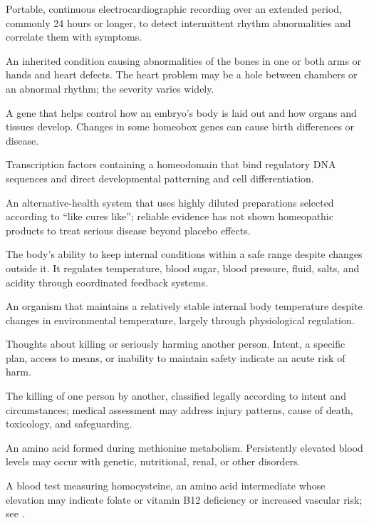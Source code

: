  Portable, continuous electrocardiographic recording over an extended period, commonly 24 hours or longer, to detect intermittent rhythm abnormalities and correlate them with symptoms.

 An inherited condition causing abnormalities of the bones in one or both arms or hands and heart defects. The heart problem may be a hole between chambers or an abnormal rhythm; the severity varies widely.

 A gene that helps control how an embryo’s body is laid out and how organs and tissues develop. Changes in some homeobox genes can cause birth differences or disease.

 Transcription factors containing a homeodomain that bind regulatory DNA sequences and direct developmental patterning and cell differentiation.

 An alternative-health system that uses highly diluted preparations selected according to “like cures like”; reliable evidence has not shown homeopathic products to treat serious disease beyond placebo effects.

 The body’s ability to keep internal conditions within a safe range despite changes outside it. It regulates temperature, blood sugar, blood pressure, fluid, salts, and acidity through coordinated feedback systems.

 An organism that maintains a relatively stable internal body temperature despite changes in environmental temperature, largely through physiological regulation.

 Thoughts about killing or seriously harming another person. Intent, a specific plan, access to means, or inability to maintain safety indicate an acute risk of harm.

 The killing of one person by another, classified legally according to intent and circumstances; medical assessment may address injury patterns, cause of death, toxicology, and safeguarding.

 An amino acid formed during methionine metabolism. Persistently elevated blood levels may occur with genetic, nutritional, renal, or other disorders.

 A blood test measuring homocysteine, an amino acid intermediate whose elevation may indicate folate or vitamin B12 deficiency or increased vascular risk; see .

